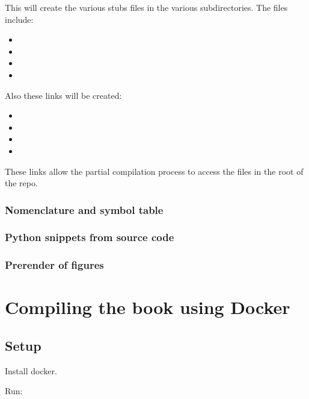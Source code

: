 This will create the various stubs files in the various subdirectories.
The files include:
\begin{itemize}
    \item {}
    \item {}
    \item {}
    \item {}
\end{itemize}
Also these links will be created:
\begin{itemize}
    \item {}
    \item {}
    \item {}
    \item {}
\end{itemize}
These links allow the partial compilation process to access the files in the root of the repo.

\subsubsection{Nomenclature and symbol table}


\subsubsection{Python snippets from source code}


\subsubsection{Prerender of figures}



\section{Compiling the book using Docker}

\subsection{Setup}

Install docker.

Run:

